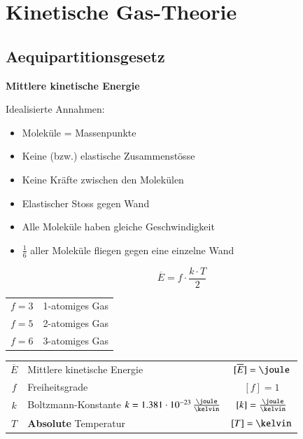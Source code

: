 \section{Kinetische Gas-Theorie}

\subsection{Aequipartitionsgesetz}

\textbf{Mittlere kinetische Energie} 

\smallskip

Idealisierte Annahmen: 

\begin{itemize}
	\item Moleküle = Massenpunkte
	\item Keine (bzw.) elastische Zusammenstösse
	\item Keine Kräfte zwischen den Molekülen
	\item Elastischer Stoss gegen Wand 
	\item Alle Moleküle haben gleiche Geschwindigkeit
	\item $\frac{1}{6}$ aller Moleküle fliegen gegen eine einzelne Wand
\end{itemize}

\medskip


\begin{minipage}[c]{0.48\columnwidth}
	$$ \boxed{ \overline{E} = f \cdot \frac{k \cdot T}{2} } $$
\end{minipage}
\hfill
\begin{minipage}[c]{0.48\columnwidth}
	\begin{tabular}{ll}
		$f = 3$	& 1-atomiges Gas \\
		$f = 5$	& 2-atomiges Gas \\
		$f = 6$	& 3-atomiges Gas \\
	\end{tabular}
\end{minipage}

\medskip

\begin{tabular}{c l c}
	$\overline{E}$	& Mittlere kinetische Energie												& $[\overline{E}] = \joule$ 		\\
	$f$ 			& Freiheitsgrade 															& $[f] = 1$ 						\\
	$k$ 			& Boltzmann-Konstante $k = 1.381 \cdot 10^{-23} \, \frac{\joule}{\kelvin}$	& $[k] = \frac{\joule}{\kelvin}$	\\
	$T$ 			& \textbf{Absolute} Temperatur 												& $[T] = \kelvin$
\end{tabular}

